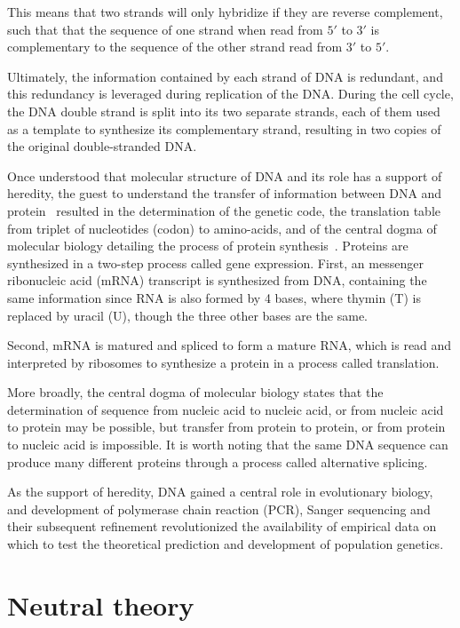 This means that two strands will only hybridize if they are reverse complement, such that that the sequence of one strand when read from $5'$ to $3'$ is complementary to the sequence of the other strand read from $3'$ to $5'$.

Ultimately, the information contained by each strand of \acrshort{DNA} is redundant, and this redundancy is leveraged during replication of the \acrshort{DNA}.
During the cell cycle, the \acrshort{DNA} double strand is split into its two separate strands, each of them used as a template to synthesize its complementary strand, resulting in two copies of the original double-stranded \acrshort{DNA}.

Once understood that molecular structure of \acrshort{DNA} and its role has a support of heredity, the guest to understand the transfer of information between \acrshort{DNA} and protein~\citep{Crick1958} resulted in the determination of the genetic code, the translation table from triplet of nucleotides (\gls{codon}) to amino-acids, and of the central dogma of molecular biology detailing the process of protein synthesis~\citep{Crick1970}.
Proteins are synthesized in a two-step process called gene expression.
First, an messenger ribonucleic acid (mRNA) transcript is synthesized from \acrshort{DNA}, containing the same information since \acrshort{RNA} is also formed by 4 bases, where thymin (T) is replaced by uracil (U), though the three other bases are the same.

Second, mRNA is matured and spliced to form a mature \acrshort{RNA}, which is read and interpreted by ribosomes to synthesize a protein in a process called translation.

More broadly, the central dogma of molecular biology states that the determination of sequence from nucleic acid to nucleic acid, or from nucleic acid to protein may be possible, but transfer from protein to protein, or from protein to nucleic acid is impossible.
It is worth noting that the same \acrshort{DNA} sequence can produce many different proteins through a process called alternative splicing.

As the support of heredity, \acrshort{DNA} gained a central role in evolutionary biology, and development of polymerase chain reaction (PCR), Sanger sequencing and their subsequent refinement revolutionized the availability of empirical data on which to test the theoretical prediction and development of population genetics.

\section{Neutral theory}

